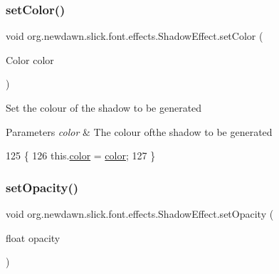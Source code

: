 \subsubsection{\texorpdfstring{set\+Color()}{setColor()}}
{\footnotesize\ttfamily void org.\+newdawn.\+slick.\+font.\+effects.\+Shadow\+Effect.\+set\+Color (\begin{DoxyParamCaption}\item[{Color}]{color }\end{DoxyParamCaption})\hspace{0.3cm}{\ttfamily [inline]}}

Set the colour of the shadow to be generated


\begin{DoxyParams}{Parameters}
{\em color} & The colour ofthe shadow to be generated \\
\hline
\end{DoxyParams}

\begin{DoxyCode}
125                                       \{
126         this.\mbox{\hyperlink{classorg_1_1newdawn_1_1slick_1_1font_1_1effects_1_1_shadow_effect_a4a5a1c31b38b33b042cadabe1593bc62}{color}} = \mbox{\hyperlink{classorg_1_1newdawn_1_1slick_1_1font_1_1effects_1_1_shadow_effect_a4a5a1c31b38b33b042cadabe1593bc62}{color}};
127     \}
\end{DoxyCode}
\mbox{\label{classorg_1_1newdawn_1_1slick_1_1font_1_1effects_1_1_shadow_effect_a0b10cb4de07a0f8a1ee70996876732a4}} 
\subsubsection{\texorpdfstring{set\+Opacity()}{setOpacity()}}
{\footnotesize\ttfamily void org.\+newdawn.\+slick.\+font.\+effects.\+Shadow\+Effect.\+set\+Opacity (\begin{DoxyParamCaption}\item[{float}]{opacity }\end{DoxyParamCaption})\hspace{0.3cm}{\ttfamily [inline]}}

